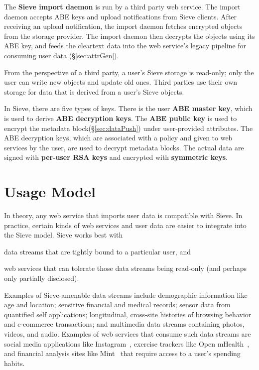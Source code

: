 The \textbf{Sieve import daemon} is run
by a third party web service. The import
daemon accepts ABE keys and upload
notifications from Sieve clients. After
receiving an upload notification, the import
daemon fetches encrypted objects from the
storage provider. The import daemon then
decrypts the objects using its ABE key,
and feeds the cleartext data into the
web service's legacy pipeline for consuming
user data (\S\ref{sec:attrGen}).

From the perspective of a third party,
a user's Sieve storage is read-only;
only the user can write
new objects and update old ones. Third
parties use their own storage for data
that is derived from a user's Sieve
objects.

In Sieve, there are five types of keys.
There is the user \textbf{ABE master key},
which is used to derive \textbf{ABE decryption keys}. The 
\textbf{ABE public key} is used to encrypt the metadata
block(\S\ref{sec:dataPush}) under user-provided
attributes. The ABE decryption keys, which are
associated with a policy and given to web 
services by the user, are used to decrypt
metadata blocks. The actual data are signed
with \textbf{per-user RSA keys} and encrypted
with \textbf{symmetric keys}.

\section{Usage Model}

In theory, any web service that imports
user data is compatible with Sieve. In
practice, certain kinds of web services
and user data are easier to integrate into
the Sieve model. Sieve works best with
  \begin{smitemize}
    \item data streams that are tightly
          bound to a particular user, and
    \item web services that can tolerate
          those data streams being read-only
          (and perhaps only partially disclosed).
  \end{smitemize}
Examples of Sieve-amenable data streams
include demographic information like age and
location; sensitive financial and medical
records; sensor data from quantified self
applications; longitudinal, cross-site
histories of browsing behavior and e-commerce
transactions; and multimedia data streams
containing photos, videos, and audio.
Examples of web services that consume such
data streams are social media applications
like Instagram~\cite{instagram}, 
exercise trackers like Open mHealth~\cite{omh}, 
and financial analysis sites like Mint~\cite{mint}
that require access to a user's spending habits.

